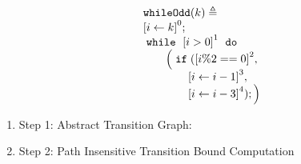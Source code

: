 \begin{example}
    \label{ex:whileOdd}
    \[
      \begin{array}{l}
          \kw{whileOdd}(k) \triangleq \\
          \clabel{ \assign{i}{k} }^{0} ; \\
              \ewhile ~ \clabel{i > 0}^{1} ~ \edo ~ \\
              \qquad \Big(
                \eif(\clabel{i \% 2 == 0 }^{2}, \\
                \qquad \qquad \clabel{\assign{i}{i - 1}}^{3},\\
                \qquad \qquad \clabel{\assign{i}{i - 3}}^{4});
                \Big)
          \end{array}
      \]
    
    \begin{enumerate}
      \item Step 1: Abstract Transition Graph:
    
    \item Step 2: Path Insensitive Transition Bound Computation
    

\end{enumerate}
\end{example}
